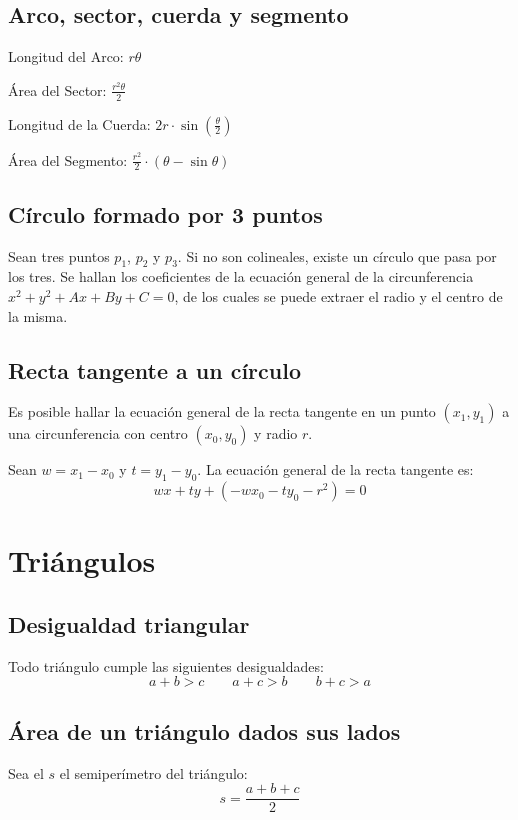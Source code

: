 \documentclass{article}
\begin{document}
\begin{multicols}{2}
\subsection{Arco, sector, cuerda y segmento}

Longitud del Arco: \( r \theta \)

Área del Sector: \( \frac{r^2 \theta}{2} \)

Longitud de la Cuerda: \( 2 r \cdot \sin (\frac{\theta}{2} ) \)

Área del Segmento: \( \frac{r^2}{2} \cdot ( \theta - \sin \theta ) \)

\subsection{Círculo formado por 3 puntos}
Sean tres puntos  \( p_1 \), \( p_2 \) y  \( p_3 \). Si no son colineales, existe un círculo que pasa por los tres. Se hallan los coeficientes de la ecuación general de la circunferencia \( x^2+y^2+Ax+By+C=0 \), de los cuales se puede extraer el radio y el centro de la misma.


\subsection{Recta tangente a un círculo}
Es posible hallar la ecuación general de la recta tangente en un punto \( (x_1, y_1) \) a una circunferencia con centro \( (x_0, y_0) \) y radio \( r \). 

Sean \( w = x_1-x_0 \) y \( t = y_1-y_0 \). La ecuación general de la recta tangente es:
\[ wx + ty + (-wx_0 - ty_0 - r^2) = 0 \]

\section{Triángulos}


\subsection{Desigualdad triangular}
Todo triángulo cumple las siguientes desigualdades:
\[ a+b > c \qquad a+c > b \qquad b+c>a \]

\subsection{Área de un triángulo dados sus lados}
Sea el \( s \) el semiperímetro del triángulo:
\[ s = \frac{a+b+c}{2} \]


\end{multicols}
\end{document}

